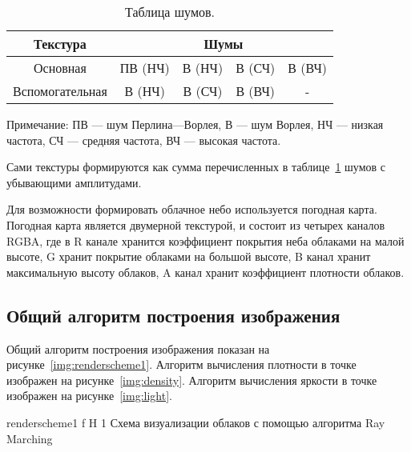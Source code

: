 \begin{table}[h]
	\centering
	\begin{threeparttable}
		\captionsetup{justification=raggedleft,singlelinecheck=false}
		\caption{Таблица шумов.}      
		\begin{tabular}{|c|c|c|c|c|}
			\hline
			Текстура & \multicolumn{4}{c|}{Шумы} \\
			\hline
			Основная & ПВ (НЧ) & В (НЧ) & В (СЧ) & В (ВЧ)\\
			\hline
			Вспомогательная & В (НЧ) & В (СЧ) & В (ВЧ) & -\\
			\hline
		\end{tabular}
		\begin{tablenotes}
			\small
			\item Примечание: ПВ --- шум Перлина---Ворлея, В --- шум Ворлея, НЧ --- низкая частота, СЧ --- средняя частота, ВЧ --- высокая частота.
		\end{tablenotes}
		\label{tab:textures}
	\end{threeparttable} 
	
	
\end{table}

Сами текстуры формируются как сумма перечисленных в таблице~\ref{tab:textures} шумов с убывающими амплитудами.

Для возможности формировать облачное небо используется погодная карта. Погодная карта является двумерной текстурой, и состоит из четырех каналов RGBA, где в R канале хранится коэффициент покрытия неба облаками на малой высоте, G хранит покрытие облаками на большой высоте, B канал хранит максимальную высоту облаков, A канал хранит коэффициент плотности облаков. 

\subsection{Общий алгоритм построения изображения}

Общий алгоритм построения изображения показан на рисунке~\ref{img:renderscheme1}. Алгоритм вычисления плотности в точке изображен на рисунке~\ref{img:density}. Алгоритм вычисления яркости в точке изображен на рисунке~\ref{img:light}.


{renderscheme1} %
{f} %
{H} %
{1\textwidth} %
{Схема визуализации облаков с помощью алгоритма Ray Marching} %


